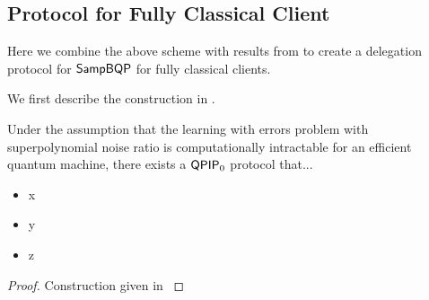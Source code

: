 \subsection{Protocol for Fully Classical Client}

Here we combine the above scheme with results from \cite{mahadev_delegation} to create a delegation protocol for $\operatorname{\mathsf{SampBQP}}$ for fully classical clients.

We first describe the construction in \cite{mahadev_delegation}.

\begin{theorem}
	Under the assumption that the learning with errors problem with superpolynomial noise ratio is computationally intractable for an efficient quantum machine, there exists a $\operatorname{\mathsf{QPIP}}_0$ protocol that...
	\begin{itemize}
		\item x
		\item y
		\item z
	\end{itemize}
\end{theorem}
\begin{proof}
	Construction given in \cite{mahadev_delegation}
\end{proof}

